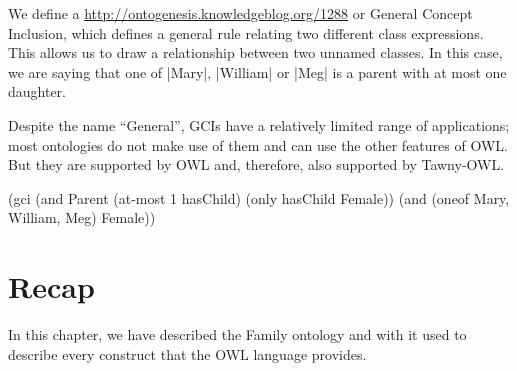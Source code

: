We define a \href{GCI}{http://ontogenesis.knowledgeblog.org/1288} or
General Concept Inclusion, which defines a general rule relating two
different class expressions. This allows us to draw a relationship
between two unnamed classes. In this case, we are saying that one of
|Mary|, |William| or |Meg| is a parent with at most one daughter.

Despite the name ``General'', GCIs have a relatively limited range of
applications; most ontologies do not make use of them and can use the
other features of OWL. But they are supported by OWL and, therefore,
also supported by Tawny-OWL.

\begin{tawny}
(gci
 (and Parent
      (at-most 1 hasChild)
      (only hasChild Female))
 (and (oneof Mary, William, Meg) Female))
\end{tawny}


\section{Recap}
\label{sec:recap-family}

In this chapter, we have described the Family ontology and with it
used to describe every construct that the OWL language provides.

